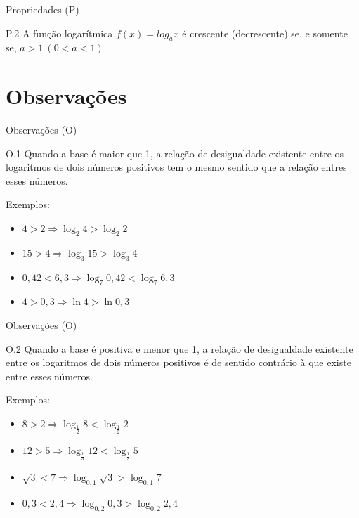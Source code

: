 \documentclass[12pt]{beamer}
\begin{document}
    \begin{frame}{Propriedades (P)}

        \begin{block}{P.2}
            A função logarítmica $f(x)=log_{a}x$ é crescente (decrescente) se, e somente se,
            $a>1\  (0<a< 1)$            
        \end{block}
    \end{frame}

\section{Observações}

    \begin{frame}{Observações (O)}
        \begin{block}{O.1}
            Quando a base é maior que 1, a relação de desigualdade existente entre os logaritmos
            de dois números positivos tem o mesmo sentido que a relação entres esses números.
        \end{block} Exemplos:

        \begin{itemize}
            \item [a)] $4>2 \Rightarrow \log_{2}4 > \log_{2}2$
            \item [b)] $15 >4 \Rightarrow \log_{3}15 > \log_{3}4$
            \item [c)] $0,42 < 6,3 \Rightarrow \log_{7}0,42 < \log_{7}6,3$
            \item [d)] $4 > 0,3 \Rightarrow \ln 4 > \ln 0,3$
        \end{itemize}
    \end{frame}

    \begin{frame}{Observações (O)}
        \begin{block}{O.2}
            Quando a base é positiva e menor que 1, a relação de desigualdade existente entre os logaritmos
            de dois números positivos é de sentido contrário à que existe entre esses números.
        \end{block} Exemplos:

        \begin{itemize}
            \item [a)] $8>2 \Rightarrow \log_{\frac{1}{2}}8 < \log_{\frac{1}{2}}2$
            \item [b)] $12>5 \Rightarrow \log_{\frac{1}{3}}12 < \log_{\frac{1}{3}}5$
            \item [c)] $\sqrt{3} < 7 \Rightarrow \log_{0,1}\sqrt{3}>\log_{0,1}7$
            \item [d)] $0,3 < 2,4 \Rightarrow \log_{0,2}0,3 > \log_{0,2}2,4$
        \end{itemize}
    \end{frame}
\end{document}
